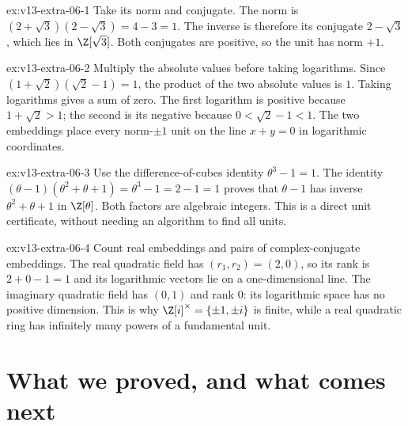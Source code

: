 \begin{solution}{ex:v13-extra-06-1}
\idea Take its norm and conjugate.
\writeup The norm is $(2+\sqrt3)(2-\sqrt3)=4-3=1$. The inverse is therefore its conjugate $2-\sqrt3$, which lies in $\Z[\sqrt3]$. Both conjugates are positive, so the unit has norm $+1$.
\end{solution}

\begin{solution}{ex:v13-extra-06-2}
\idea Multiply the absolute values before taking logarithms.
\writeup Since $(1+\sqrt2)(\sqrt2-1)=1$, the product of the two absolute values is $1$. Taking logarithms gives a sum of zero. The first logarithm is positive because $1+\sqrt2>1$; the second is its negative because $0<\sqrt2-1<1$. The two embeddings place every norm-$\pm1$ unit on the line $x+y=0$ in logarithmic coordinates.
\end{solution}

\begin{solution}{ex:v13-extra-06-3}
\idea Use the difference-of-cubes identity $\theta^3-1=1$.
\writeup The identity $(\theta-1)(\theta^2+\theta+1)=\theta^3-1=2-1=1$ proves that $\theta-1$ has inverse $\theta^2+\theta+1$ in $\Z[\theta]$. Both factors are algebraic integers. This is a direct unit certificate, without needing an algorithm to find all units.
\end{solution}

\begin{solution}{ex:v13-extra-06-4}
\idea Count real embeddings and pairs of complex-conjugate embeddings.
\writeup The real quadratic field has $(r_1,r_2)=(2,0)$, so its rank is $2+0-1=1$ and its logarithmic vectors lie on a one-dimensional line. The imaginary quadratic field has $(0,1)$ and rank $0$: its logarithmic space has no positive dimension. This is why $\Z[i]^\times=\{\pm1,\pm i\}$ is finite, while a real quadratic ring has infinitely many powers of a fundamental unit.
\end{solution}

\section{What we proved, and what comes next}

